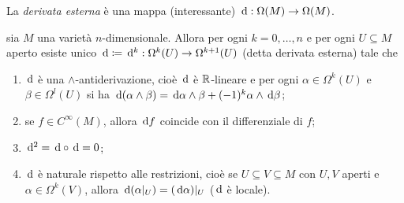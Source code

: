 La \emph{derivata esterna} è una mappa (interessante) $\,\mathrm d:\Omega(M) \to \Omega(M)$.

\begin{theorem}
	sia $M$ una varietà $n$-dimensionale. Allora per ogni $k=0,\ldots,n$ e per ogni $U\subseteq M$ aperto esiste unico $\,\mathrm d \coloneqq \,\mathrm d^k : \Omega^k(U) \to \Omega^{k+1}(U)$ (detta derivata esterna) tale che
	\begin{enumerate}
		\item $\,\mathrm d$ è una $\wedge$-antiderivazione, cioè $\,\mathrm d$ è $\mathbb R$-lineare e per ogni $\alpha\in\Omega^k(U)$ e $\beta\in\Omega^l(U)$ si ha $\,\mathrm d(\alpha\wedge\beta) = \,\mathrm d\alpha \wedge \beta +(-1)^k \alpha\wedge \,\mathrm d \beta$;
		\item se $f\in C^\infty(M)$, allora $\,\mathrm d f$ coincide con il differenziale di $f$;
		\item $\,\mathrm d^2 = \,\mathrm d\circ \,\mathrm d = 0$;
		\item $\,\mathrm d$ è naturale rispetto alle restrizioni, cioè se $U\subseteq V \subseteq M$ con $U,V$ aperti e $\alpha\in\Omega^k(V)$, allora $\,\mathrm d(\alpha|_ U) = (\,\mathrm d\alpha)|_ U$ ($\,\mathrm d$ è locale).
	\end{enumerate}
\end{theorem}
